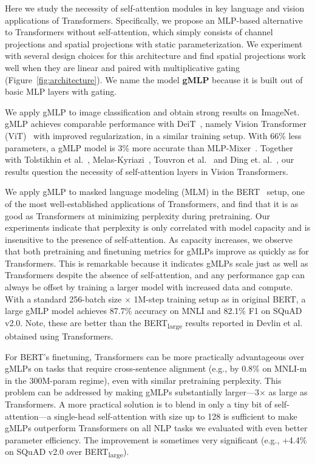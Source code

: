 \documentclass{article}
\newcommand{\gffn}{gMLP\xspace}
\begin{document}
Here we study the necessity of self-attention modules in key language and vision applications of Transformers.
Specifically,
we propose an MLP-based alternative to Transformers without self-attention, which simply consists of channel projections and spatial projections with static parameterization.
We experiment with several design choices for this architecture and find spatial projections
work well when they are linear and paired with multiplicative gating (Figure~\ref{fig:architecture}).
We name the model \textbf{\gffn} because it is built out of basic MLP layers with gating.


We apply \gffn to image classification and obtain strong results on ImageNet. \gffn achieves comparable performance with DeiT~\cite{touvron2020training}, namely Vision Transformer (ViT)~\cite{dosovitskiy2020image} with improved regularization,
in a similar training setup. 
With 66\% less parameters, a \gffn model is 3\% more accurate than MLP-Mixer~\cite{tolstikhin2021mlpmixer}. Together with Tolstikhin et al.~\cite{tolstikhin2021mlpmixer}, Melas-Kyriazi~\cite{melaskyriazi2021doyou}, Touvron et al.~\cite{touvron2021resmlp} and Ding et. al.~\cite{ding2021repmlp}, our results question the necessity of self-attention layers in Vision Transformers.

We apply \gffn to masked language modeling (MLM) in the BERT~\cite{devlin2018bert} setup, one of the most well-established applications of Transformers,
and find that it is as good as Transformers at minimizing perplexity during pretraining.
Our experiments indicate that perplexity is only correlated with model capacity and is insensitive to the presence of self-attention.
As capacity increases, we observe that both pretraining and finetuning metrics for \gffn{s} improve as quickly as for Transformers.
This is remarkable because it indicates \gffn{s} scale just as well as Transformers despite the absence of self-attention, and any performance gap can always be offset by training a larger model with increased data and compute.
With a standard 256-batch size $\times$ 1M-step training setup as in original BERT, a large gMLP model achieves 87.7\% accuracy on MNLI and 82.1\% F1 on SQuAD v2.0.
Note, these are better than the BERT\textsubscript{large} results reported in Devlin et al.~\cite{devlin2018bert} obtained using Transformers.

For BERT's finetuning, Transformers can be more practically advantageous over \gffn{s} 
on tasks that require cross-sentence alignment (e.g., by 0.8\% on MNLI-m in the 300M-param regime), even with similar pretraining perplexity. This problem can be addressed by making \gffn{s} substantially larger---3$\times$ as large as Transformers. A more practical solution is to blend in only a tiny bit of self-attention---a single-head self-attention with size up to 128 is sufficient to make \gffn{s} outperform Transformers on all NLP tasks we evaluated with even better parameter efficiency.
The improvement is sometimes very significant (e.g., +4.4\% on SQuAD v2.0 over BERT\textsubscript{large}).
\end{document}
